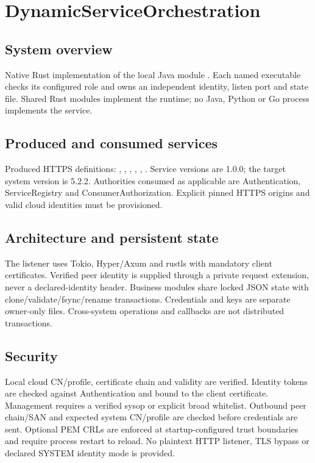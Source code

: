 \documentclass[a4paper]{arrowhead}
\begin{document}
\ArrowheadSetup
\section{DynamicServiceOrchestration}
\subsection{System overview}
Native Rust implementation of the local Java module . Each named executable checks its configured role and owns an independent identity, listen port and state file. Shared Rust modules implement the runtime; no Java, Python or Go process implements the service.
\subsection{Produced and consumed services}
Produced HTTPS definitions: , \allowbreak {}, \allowbreak {}, \allowbreak {}, \allowbreak {}, \allowbreak {}. Service versions are 1.0.0; the target system version is 5.2.2. Authorities consumed as applicable are Authentication, ServiceRegistry and ConsumerAuthorization. Explicit pinned HTTPS origins and valid cloud identities must be provisioned.
\subsection{Architecture and persistent state}
The listener uses Tokio, Hyper/Axum and rustls with mandatory client certificates. Verified peer identity is supplied through a private request extension, never a declared-identity header. Business modules share locked JSON state with clone/validate/fsync/rename transactions. Credentials and keys are separate owner-only files. Cross-system operations and callbacks are not distributed transactions.
\subsection{Security}
Local cloud CN/profile, certificate chain and validity are verified. Identity tokens are checked against Authentication and bound to the client certificate. Management requires a verified sysop or explicit broad whitelist. Outbound peer chain/SAN and expected system CN/profile are checked before credentials are sent. Optional PEM CRLs are enforced at startup-configured trust boundaries and require process restart to reload. No plaintext HTTP listener, TLS bypass or declared SYSTEM identity mode is provided.
\end{document}
